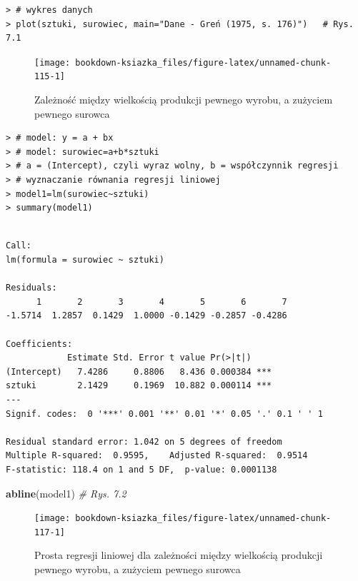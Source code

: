 \documentclass[12pt,B5paper,]{book}
\newenvironment{Shaded}{\begin{snugshade}}{\end{snugshade}}
\newcommand{\KeywordTok}[1]{\textcolor[rgb]{0.13,0.29,0.53}{\textbf{#1}}}
\newcommand{\CommentTok}[1]{\textcolor[rgb]{0.56,0.35,0.01}{\textit{#1}}}
\newcommand{\NormalTok}[1]{#1}
\begin{document}
\begin{verbatim}
> # wykres danych
> plot(sztuki, surowiec, main="Dane - Greń (1975, s. 176)")   # Rys. 7.1
\end{verbatim}

\begin{figure}[H]

{\centering \texttt{[image: bookdown-ksiazka\_files/figure-latex/unnamed-chunk-115-1]} 

}

\caption{Zależność między wielkością produkcji pewnego wyrobu, a zużyciem pewnego surowca}\label{fig:unnamed-chunk-115}
\end{figure}

\begin{verbatim}
> # model: y = a + bx
> # model: surowiec=a+b*sztuki
> # a = (Intercept), czyli wyraz wolny, b = współczynnik regresji
> # wyznaczanie równania regresji liniowej
> model1=lm(surowiec~sztuki)
> summary(model1)
\end{verbatim}

\begin{verbatim}

Call:
lm(formula = surowiec ~ sztuki)

Residuals:
      1       2       3       4       5       6       7 
-1.5714  1.2857  0.1429  1.0000 -0.1429 -0.2857 -0.4286 

Coefficients:
            Estimate Std. Error t value Pr(>|t|)    
(Intercept)   7.4286     0.8806   8.436 0.000384 ***
sztuki        2.1429     0.1969  10.882 0.000114 ***
---
Signif. codes:  0 '***' 0.001 '**' 0.01 '*' 0.05 '.' 0.1 ' ' 1

Residual standard error: 1.042 on 5 degrees of freedom
Multiple R-squared:  0.9595,    Adjusted R-squared:  0.9514 
F-statistic: 118.4 on 1 and 5 DF,  p-value: 0.0001138
\end{verbatim}

\begin{Shaded}
\begin{Highlighting}[]
\KeywordTok{abline}\NormalTok{(model1)  }\CommentTok{# Rys. 7.2}
\end{Highlighting}
\end{Shaded}

\begin{figure}

{\centering \texttt{[image: bookdown-ksiazka\_files/figure-latex/unnamed-chunk-117-1]} 

}

\caption{Prosta regresji liniowej dla zależności między wielkością produkcji pewnego wyrobu, a zużyciem pewnego surowca}\label{fig:unnamed-chunk-117}
\end{figure}
\end{document}
